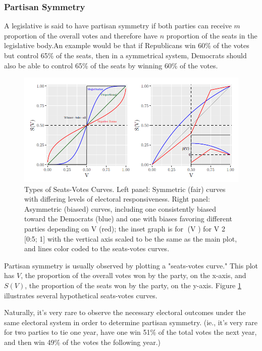 \subsubsection{Partisan Symmetry}

A legislative is said to have partisan symmetry if both parties can receive $m$ proportion of the overall votes and therefore have $n$ proportion of the seats in the legislative body.An example would be that if Republicans win 60\% of the votes but control 65\% of the seats, then in a symmetrical system, Democrats should also be able to control 65\% of the seats by winning 60\% of the votes. \textcite{katz2020}

\begin{figure}
    \includegraphics[width=\linewidth]{img/seatsvotes.png}
    \caption{Types of Seats-Votes Curves. Left panel: Symmetric (fair) curves with differing
    levels of electoral responsiveness. Right panel: Asymmetric (biased) curves, including
    one consistently biased toward the Democrats (blue) and one with biases favoring different
    parties depending on V (red); the inset graph is for (V ) for V 2 [0:5; 1] with the vertical
    axis scaled to be the same as the main plot, and lines color coded to the seats-votes curves. \parencite[175]{katz2020}}
    \label{fig:seatsvotes1}
\end{figure}

Partisan symmetry is usually observed by plotting a "seats-votes curve." This plot has $V$, the proportion of the overall votes won by the party, on the x-axis, and $S(V)$, the proportion of the seats won by the party, on the y-axis. Figure \ref{fig:seatsvotes1} \parencite[175]{katz2020} illustrates several hypothetical seats-votes curves.

Naturally, it's very rare to observe the necessary electoral outcomes under the same electoral system in order to determine partisan symmetry. (ie., it's very rare for two parties to tie one year, have one win 51\% of the total votes the next year, and then win 49\% of the votes the following year.)

